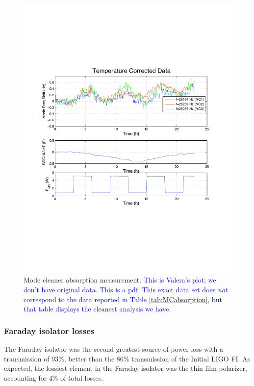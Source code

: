 \begin{figure}
\begin{centering}
\includegraphics[width=1.0\textwidth]{figures/MCdrumheadFeb08_Tcorrected.pdf}
\caption{Mode cleaner absorption measurement. \textcolor{blue}{This is Valera's plot;
  we don't have original data. This is a pdf. This exact data set does
\emph{not} correspond to the data reported in Table
\ref{tab:MCabsorption}, but that table displays the cleanest analysis
we have.}}
\label{fig:MCabsorption}
\end{centering}
\end{figure}



\subsubsection{Faraday isolator losses} 
The Faraday isolator was the second greatest source of power loss with
a transmission of 93\%, better than the 86\% transmission
of the Initial LIGO FI. As expected, the lossiest element in the
Faraday isolator was the thin film polarizer, accounting for 4\% of
total losses. 



